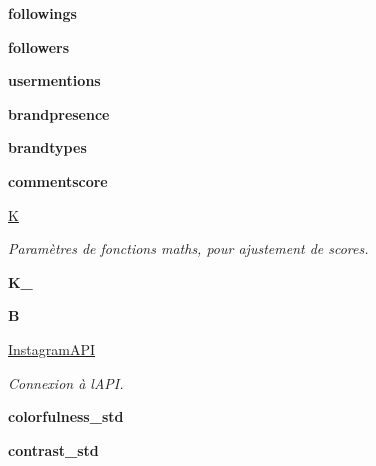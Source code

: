 \begin{DoxyCompactItemize}
{\bfseries followings}
\item 
\mbox{\label{classuser_1_1_user_a6c75e0121b5cd3810b18ba8bb5415731}} 
{\bfseries followers}
\item 
\mbox{\label{classuser_1_1_user_a1299fa6854061f717587f485cbd65e9d}} 
{\bfseries usermentions}
\item 
\mbox{\label{classuser_1_1_user_abd0372db83f1098f7b0f2d135ce16e99}} 
{\bfseries brandpresence}
\item 
\mbox{\label{classuser_1_1_user_abb534bea6556322d857746a2bbd8d1ba}} 
{\bfseries brandtypes}
\item 
\mbox{\label{classuser_1_1_user_a5dff9881f19c6e51a38ec00ad5023b52}} 
{\bfseries commentscore}
\item 
\mbox{\hyperlink{classuser_1_1_user_a40a93b76c643c0eb076abc8ae0f15f31}{K}}
\begin{DoxyCompactList}\small\item\em Paramètres de fonctions maths, pour ajustement de scores. \end{DoxyCompactList}\item 
\mbox{\label{classuser_1_1_user_a6d7d87038a73b8d70d9a42527c9327bb}} 
{\bfseries K\+\_\+}
\item 
\mbox{\label{classuser_1_1_user_ab533b4b4d7236b1c4a18a462605fa34d}} 
{\bfseries B}
\item 
\mbox{\hyperlink{classuser_1_1_user_a6bd90421024505f3be18cab7f2b56dd8}{Instagram\+A\+PI}}
\begin{DoxyCompactList}\small\item\em Connexion à l\textquotesingle{}A\+PI. \end{DoxyCompactList}\item 
\mbox{\label{classuser_1_1_user_a760c3a66bfca4082009586aa5b78f2da}} 
{\bfseries colorfulness\+\_\+std}
\item 
\mbox{\label{classuser_1_1_user_aea903db123f8c9cd65025aa76a4c0555}} 
{\bfseries contrast\+\_\+std}
\item 

\end{DoxyCompactItemize}

